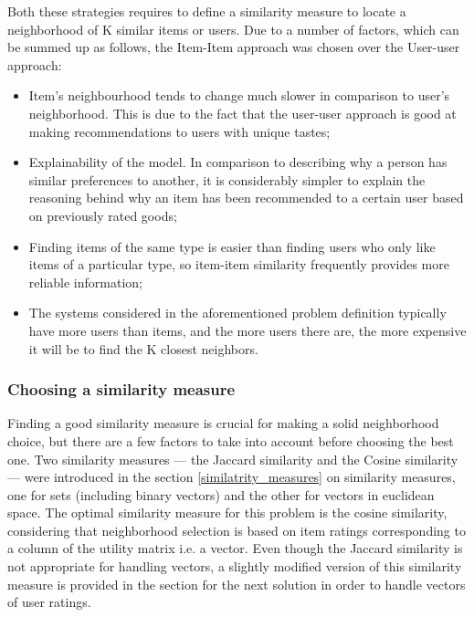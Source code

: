 Both these strategies requires to define a similarity measure to locate a neighborhood of K similar items or users. Due to a number of factors, which can be summed up as follows, the Item-Item approach was chosen over the User-user approach: 
\begin{itemize}
    \item Item's neighbourhood tends to change much slower in comparison to user's neighborhood. This is due to the fact that the user-user approach is good at making recommendations to users with unique tastes;
    \item Explainability of the model. In comparison to describing why a person has similar preferences to another, it is considerably simpler to explain the reasoning behind why an item has been recommended to a certain user based on previously rated goods; 
    \item Finding items of the same type is easier than finding users who only like items of a particular type, so item-item similarity frequently provides more reliable information;
    \item The systems considered in the aforementioned problem definition typically have more users than items, and the more users there are, the more expensive it will be to find the K closest neighbors. 
\end{itemize}

\subsubsection{Choosing a similarity measure}
\label{choosing_a_similarity_measure}
Finding a good similarity measure is crucial for making a solid neighborhood choice, but there are a few factors to take into account before choosing the best one. Two similarity measures — the Jaccard similarity and the Cosine similarity — were introduced in the section \ref{similatrity_measures} on similarity measures, one for sets (including binary vectors) and the other for vectors in euclidean space.
The optimal similarity measure for this problem is the cosine similarity, considering that neighborhood selection is based on item ratings corresponding to a column of the utility matrix i.e. a vector.
Even though the Jaccard similarity is not appropriate for handling vectors, a slightly modified version of this similarity measure is provided in the section for the next solution in order to handle vectors of user ratings. 

